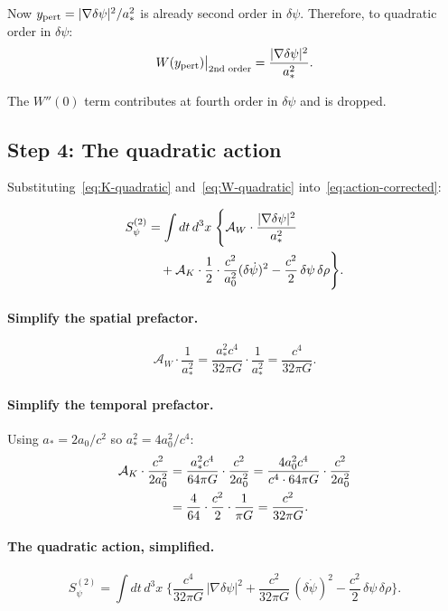 \documentclass[aps,prd,twocolumn,nofootinbib]{revtex4-2}
\newcommand{\aM}{a_0}
\newcommand{\astar}{a_*}
\newcommand{\dpsi}{\delta\psi}
\begin{document}
Now $y_{\rm pert} = |\nabla\dpsi|^2/\astar^2$ is already second order
in $\dpsi$. Therefore, to quadratic order in $\dpsi$:
\begin{equation}
W(y_{\rm pert})\big|_{\text{2nd order}} = \frac{|\nabla\dpsi|^2}{\astar^2}.
\label{eq:W-quadratic}
\end{equation}

The $W''(0)$ term contributes at fourth order in $\dpsi$ and is dropped.

\subsection{Step 4: The quadratic action}

Substituting~\eqref{eq:K-quadratic} and~\eqref{eq:W-quadratic}
into~\eqref{eq:action-corrected}:

\begin{align}
S^{(2)}_\psi &= \int dt\,d^3x\;\Biggl\{
  \mathcal{A}_W\cdot\frac{|\nabla\dpsi|^2}{\astar^2}
  \notag\\
  &\quad+ \mathcal{A}_K\cdot\frac{1}{2}\cdot\frac{c^2}{\aM^2}(\delta\dot\psi)^2
  - \frac{c^2}{2}\,\dpsi\,\delta\rho
\Biggr\}.
\label{eq:S2-raw}
\end{align}

\paragraph{Simplify the spatial prefactor.}
\begin{equation}
\mathcal{A}_W \cdot \frac{1}{\astar^2}
= \frac{\astar^2 c^4}{32\pi G}\cdot\frac{1}{\astar^2}
= \frac{c^4}{32\pi G}.
\label{eq:spatial-coeff}
\end{equation}

\paragraph{Simplify the temporal prefactor.}
Using $\astar = 2\aM/c^2$ so $\astar^2 = 4\aM^2/c^4$:
\begin{align}
\mathcal{A}_K \cdot \frac{c^2}{2\aM^2}
&= \frac{\astar^2 c^4}{64\pi G}\cdot\frac{c^2}{2\aM^2}
= \frac{4\aM^2 c^4}{c^4\cdot 64\pi G}\cdot\frac{c^2}{2\aM^2}
\notag\\
&= \frac{4}{64}\cdot\frac{c^2}{2}\cdot\frac{1}{\pi G}
= \frac{c^2}{32\pi G}.
\label{eq:temporal-coeff}
\end{align}

\paragraph{The quadratic action, simplified.}
\begin{equation}
\boxed{
S^{(2)}_\psi = \int dt\,d^3x\;\Biggl\{
  \frac{c^4}{32\pi G}\,|\nabla\dpsi|^2
  + \frac{c^2}{32\pi G}\,(\delta\dot\psi)^2
  - \frac{c^2}{2}\,\dpsi\,\delta\rho
\Biggr\}.
}
\label{eq:S2-clean}
\end{equation}
\end{document}
